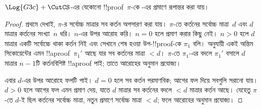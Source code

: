 \documentclass[../../../include/open-logic-section]{subfiles}
\begin{document}
\begin{thm}
$\Log{G3c}+\CutCS$-এর যেকোনো !!{proof}~$\pi$-কে
-এর প্রমাণে রূপান্তর করা যায়।
\end{thm}

\begin{proof}
  প্রথমে দেখাই, $\pi$-র সর্বোচ্চ মাত্রার সব কর্তন অপসারণ
  করা যায়। $\pi$-তে কর্তনের সর্বোচ্চ মাত্রা~$d$ এবং
  $d$ মাত্রার কর্তনের সংখ্যা~$n$ ধরি। $n$-এর উপর আরোহ
  করি। $n=0$ হলে প্রমাণ করার কিছু নেই। $n>0$ হলে
  $d$ মাত্রার একটি সর্বোচ্চে থাকা কর্তন নিই এবং সেখানে
  শেষ হওয়া উপ-!!{proof}-কে $\pi_1$ বলি।
   অনুযায়ী একই অন্তিম
  সিকোয়েন্টের এমন !!a{proof}~$\pi_1'$ আছে যার সব
  কর্তনের মাত্রা $<d$। $\pi$-তে $\pi_1$-এর বদলে
  $\pi_1'$ বসালে $d$ মাত্রার $n-1$টি কর্তনবিশিষ্ট
  !!a{proof} পাই; তাতে আরোহের অনুমান প্রযোজ্য।

  এবার $d$-এর উপর আরোহে ফলটি পাই। $d=0$ হলে সব
  কর্তন পরমাণবিক; আগের ফল দিয়ে সবগুলি সরানো যায়।
  $d>0$ হলে আগের ফল এমন প্রমাণ দেয়, যাতে
  $d$ মাত্রার সব কর্তনের বদলে $<d$ মাত্রার কর্তন
  আছে। যেহেতু $\pi$-তে $d$-ই ছিল কর্তনের সর্বোচ্চ
  মাত্রা, নতুন প্রমাণে সর্বোচ্চ মাত্রা $<d$; ফলে
  আরোহের অনুমান প্রযোজ্য।
\end{proof}
\end{document}

